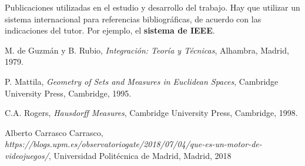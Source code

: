 \begin{thebibliography}{99}
 Publicaciones utilizadas en el estudio y desarrollo del trabajo.
Hay que utilizar un sistema internacional para referencias bibliográficas, de acuerdo con las indicaciones del tutor. Por ejemplo, el \textbf{sistema de IEEE}.

 M. de Guzmán y B. Rubio, \textit{Integración: Teoría y Técnicas}, Alhambra, Madrid, 1979.

 P. Mattila, \textit{Geometry of Sets and Measures in Euclidean Spaces}, Cambridge University Press, Cambridge, 1995.

 C.A. Rogers, \textit{Hausdorff Measures}, Cambridge University Press, Cambridge, 1998.

 Alberto Carrasco Carrasco, \textit{https://blogs.upm.es/observatoriogate/2018/07/04/que-es-un-motor-de-videojuegos/}, Universidad Politécnica de Madrid, Madrid, 2018

\end{thebibliography}

